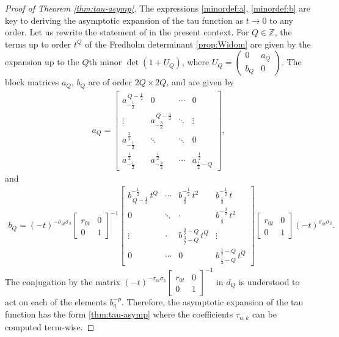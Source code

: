 \documentclass[a4paper,reqno,11pt]{amsart}
\numberwithin{equation}{section}
\numberwithin{figure}{section}
\theoremstyle{plain}
\theoremstyle{remark}
\numberwithin{rhp}{section}
\begin{document}
\begin{proof}[Proof of Theorem \ref{thm:tau-asymp}]
The expressions \eqref{minordef:a}, \eqref{minordef:b} are key to deriving the asymptotic expansion of the tau function as $t\to 0$ to any order. Let us rewrite the statement of \cite[Theorem 2.12]{GavrylenkoLisovyi2017} in the present context. For $Q\in \mathbb{Z}$, the terms up to order $t^{Q}$ of the Fredholm determinant \eqref{prop:Widom} are given by the expansion up to the $Q$th minor $\det \left(1+U_Q\right)$, where $U_{Q} = \left(\begin{array}{cc}
    0 & a_Q \\
    b_Q & 0
\end{array} \right)$. The block matrices $a_{Q}$, $b_{Q}$ are of order $2Q \times 2Q$, and are given by 
\begin{align}
   a_Q=
\begin{bmatrix}
a^{\,Q-\frac12}_{-\frac12} & 0 & \cdots & 0 \\
\vdots & a^{\,Q-\frac32}_{-\frac32} & \ddots & \vdots \\
a^{\,\frac32}_{-\frac12} & \ddots & \ddots & 0 \\
a^{\,\frac12}_{-\frac12} & a^{\,\frac12}_{-\frac32} & \cdots & a^{\,\frac12}_{\frac12-Q}
\end{bmatrix}, 
\end{align}
and
\begin{align}
b_Q
= (-t)^{-\sigma_{0t} \sigma_3} \begin{bmatrix}
         r_{0t} & 0 \\
         0 & 1
     \end{bmatrix}^{-1}
\begin{bmatrix}
b^{-\frac12}_{\,Q-\frac12}\, t^{Q}&\cdots& b^{-\frac12}_{\,\frac32}\, t^{2} & b^{-\frac12}_{\,\frac12}\, t \\
0 & \ddots & \cdot & b^{-\frac32}_{\,\frac12}\, t^{2} \\
\vdots & \cdot & b^{\,\frac32-Q}_{\,\frac32-Q}\, t^{Q} & \vdots \\
0 & \cdots & 0 & b^{\,\frac12-Q}_{\,\frac12-Q}\, t^{Q}
\end{bmatrix}
\begin{bmatrix}
         r_{0t} & 0 \\
         0 & 1
     \end{bmatrix} (-t)^{\sigma_{0t} \sigma_3}.
\end{align}
The conjugation by the matrix $(-t)^{-\sigma_{0t} \sigma_3} \begin{bmatrix}
         r_{0t} & 0 \\
         0 & 1
     \end{bmatrix}^{-1} $ in $d_Q$ is understood to act on each of the elements $b^{-p}_q$. Therefore, the asymptotic expansion of the tau function has the form \eqref{thm:tau-asymp} where the coefficients $\widehat{\tau}_{n,k}$ can  be computed term-wise. 



\end{proof}
\end{document}
